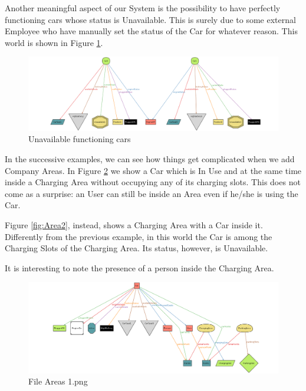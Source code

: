 Another meaningful aspect of our System is the possibility to have perfectly functioning cars whose status is Unavailable. This is surely due to some external Employee who have manually set the status of the Car for whatever reason. This world is shown in Figure \ref{fig:PerfectCarsUnavailable}. 

\begin{figure}[!htbp]
\centering
\includegraphics[width=\linewidth,keepaspectratio]{../Alloy/Exported/Images/UnavailableFunctioningCars.png}
\caption{Unavailable functioning cars}
\label{fig:PerfectCarsUnavailable}
\end{figure}
\FloatBarrier

In the successive examples, we can see how things get complicated when we add Company Areas. In Figure \ref{fig:Area1} we show a Car which is In Use and at the same time inside a Charging Area without occupying any of its charging slots. This does not come as a surprise: an User can still be inside an Area even if he/she is using the Car.

Figure \ref{fig:Area2}, instead, shows a Charging Area with a Car inside it. Differently from the previous example, in this world the Car is among the Charging Slots of the Charging Area. Its status, however, is Unavailable.

It is interesting to note the presence of a person inside the Charging Area.

\begin{figure}[!htbp]
\centering
\includegraphics[width=\linewidth,keepaspectratio]{../Alloy/Exported/Images/Areas_1.png}
\caption{File Areas 1.png}
\label{fig:Area1}
\end{figure}
\FloatBarrier

